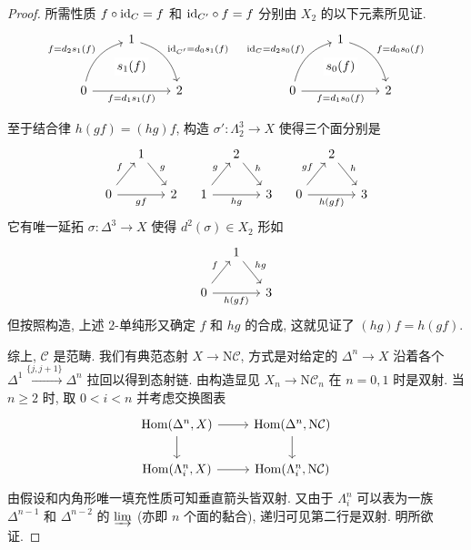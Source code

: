\begin{proof}
	所需性质 $f \circ \mathrm{id}_C = f$ 和 $\mathrm{id}_{C'} \circ f = f$ 分别由 $X_2$ 的以下元素所见证.
	\[ \begin{tikzcd}[row sep=large]
		& 1 \arrow[rd, bend left, "{\identity_{C'} = d_0 s_1(f)}"] & \\
		0 \arrow[rr, "{}" name=A, "{f = d_1 s_1(f)}"'] \arrow[ru, bend left, "{f = d_2 s_1(f)}"] & & 2 \arrow[phantom, from=1-2, to=A, "{s_1(f)}" description]
	\end{tikzcd} \quad \begin{tikzcd}[row sep=large]
		& 1 \arrow[rd, bend left, "{f = d_0 s_0(f)}"] & \\
		0 \arrow[rr, "{}" name=A, "{f = d_1 s_0(f)}"'] \arrow[ru, bend left, "{\identity_C = d_2 s_0(f)}"] & & 2 \arrow[phantom, from=1-2, to=A, "{s_0(f)}" description]
	\end{tikzcd}\]
	
	至于结合律 $h(gf) = (hg)f$, 构造 $\sigma': \Lambda^3_2 \to X$ 使得三个面分别是
	\[\begin{tikzcd}[column sep=small]
		& 1 \arrow[rd, "g"] & \\
		0 \arrow[ru, "f"] \arrow[rr, "gf"'] & & 2
	\end{tikzcd} \quad \begin{tikzcd}[column sep=small]
		& 2 \arrow[rd, "h"] & \\
		1 \arrow[ru, "g"] \arrow[rr, "hg"'] & & 3
	\end{tikzcd} \quad \begin{tikzcd}[column sep=small]
		& 2 \arrow[rd, "h"] & \\
		0 \arrow[ru, "gf"] \arrow[rr, "h(gf)"'] & & 3
	\end{tikzcd}\]
	它有唯一延拓 $\sigma: \Delta^3 \to X$ 使得 $d^2(\sigma) \in X_2$ 形如
	\[\begin{tikzcd}[column sep=small]
		& 1 \arrow[rd, "hg"] & \\
		0 \arrow[ru, "f"] \arrow[rr, "h(gf)"'] & & 3
	\end{tikzcd} \]
	但按照构造, 上述 $2$-单纯形又确定 $f$ 和 $hg$ 的合成, 这就见证了 $(hg)f = h(gf)$.
	
	综上, $\mathcal{C}$ 是范畴. 我们有典范态射 $X \to \mathrm{N}\mathcal{C}$, 方式是对给定的 $\Delta^n \to X$ 沿着各个 $\Delta^1 \xrightarrow{\{j, j+1\}} \Delta^n$ 拉回以得到态射链. 由构造显见 $X_n \to \mathrm{N}\mathcal{C}_n$ 在 $n=0, 1$ 时是双射. 当 $n \geq 2$ 时, 取 $0 < i < n$ 并考虑交换图表
	\[\begin{tikzcd}
		\Hom(\Delta^n, X) \arrow[d] \arrow[r] & \Hom(\Delta^n, \mathrm{N}\mathcal{C}) \arrow[d] \\
		\Hom(\Lambda^n_i, X) \arrow[r] & \Hom(\Lambda^n_i, \mathrm{N}\mathcal{C})
	\end{tikzcd}\]	
	由假设和内角形唯一填充性质可知垂直箭头皆双射. 又由于 $\Lambda^n_i$ 可以表为一族 $\Delta^{n-1}$ 和 $\Delta^{n-2}$ 的 $\varinjlim$ (亦即 $n$ 个面的黏合), 递归可见第二行是双射. 明所欲证.
\end{proof}


